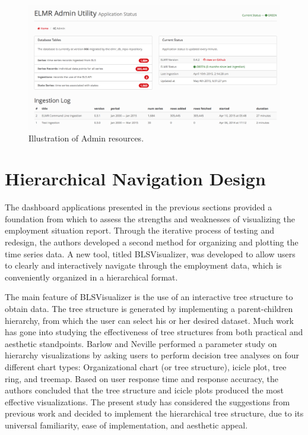 \documentclass{sigchi}
\begin{document}
\begin{figure}[!ht]
    \centering
    \includegraphics[width=1.75\columnwidth]{figures/Admin.png}
    \caption{Illustration of Admin resources.}
    \label{fig:admin}
\end{figure}


\section{Hierarchical Navigation Design}

The dashboard applications presented in the previous sections provided a foundation from which to assess the strengths and weaknesses of visualizing the employment situation report. Through the iterative process of testing and redesign, the authors developed a second method for organizing and plotting the time series data.  A new tool, titled BLSVisualizer, was developed to allow users to clearly and interactively navigate through the employment data, which is conveniently organized in a hierarchical format.

The main feature of BLSVisualizer is the use of an interactive tree structure to obtain data. The tree structure is generated by implementing a parent-children hierarchy, from which the user can select his or her desired dataset. Much work has gone into studying the effectiveness of tree structures from both practical \cite{barlow2001comparison, plaisant2002spacetree} and aesthetic \cite{wetherell1979tidy, reingold1981tidier} standpoints. Barlow and Neville performed a parameter study on hierarchy visualizations by asking users to perform decision tree analyses on four different chart types: Organizational chart (or tree structure), icicle plot, tree ring, and treemap. Based on user response time and response accuracy, the authors concluded that the tree structure and icicle plots produced the most effective visualizations. The present study has considered the suggestions from previous work and decided to implement the hierarchical tree structure, due to its universal familiarity, ease of implementation, and aesthetic appeal.
\end{document}
